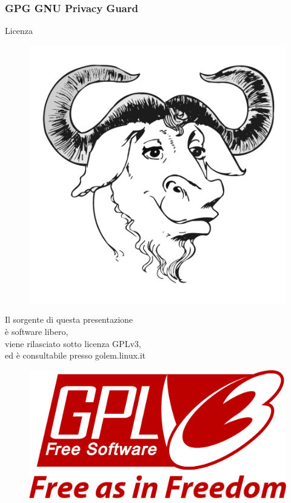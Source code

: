 \documentclass{beamer}
\begin{document}
\begin{frame}
  \frametitle{GPG GNU Privacy Guard}

  \begin{block}{Licenza}
    \centering
    \begin{minipage}{.18\linewidth}
      \begin{figure}
        \centering
        \includegraphics[width=.9\linewidth]{gnu.pdf}
      \end{figure}
    \end{minipage}
    \hfill
    \begin{minipage}{.6\linewidth}
      \centering
      Il sorgente di questa presentazione\\
      è software libero,\\
      viene rilasciato sotto licenza GPLv3,\\
      ed è consultabile presso golem.linux.it
    \end{minipage}
    \hfill
    \begin{minipage}{.18\linewidth}
      \begin{figure}
        \centering
        \includegraphics[width=.9\linewidth]{gpl3.pdf}
      \end{figure}
    \end{minipage}


\end{block}
\end{frame}
\end{document}
